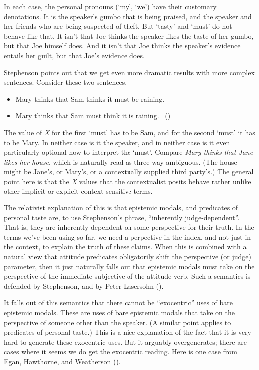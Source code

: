 \documentclass[
  10pt,
  letterpaper,
  DIV=11,
  numbers=noendperiod,
  twoside]{scrartcl}
\providecommand{\tightlist}{%
  \setlength{\itemsep}{0pt}\setlength{\parskip}{0pt}}\usepackage{longtable,booktabs,array}
\begin{document}
In each case, the personal pronouns (`my', `we') have their customary
denotations. It is the speaker's gumbo that is being praised, and the
speaker and her friends who are being suspected of theft. But `tasty'
and `must' do not behave like that. It isn't that Joe thinks the speaker
likes the taste of her gumbo, but that Joe himself does. And it isn't
that Joe thinks the speaker's evidence entails her guilt, but that Joe's
evidence does.

Stephenson points out that we get even more dramatic results with more
complex sentences. Consider these two sentences.

\begin{itemize}
\tightlist
\item
  Mary thinks that Sam thinks it must be raining.
\item
  Mary thinks that Sam must think it is raining.
  ~()
\end{itemize}

The value of \emph{X} for the first `must' has to be Sam, and for the
second `must' it has to be Mary. In neither case is it the speaker, and
in neither case is it even particularly optional how to interpret the
`must'. Compare \emph{Mary thinks that Jane likes her house}, which is
naturally read as three-way ambiguous. (The house might be Jane's, or
Mary's, or a contextually supplied third party's.) The general point
here is that the \emph{X} values that the contextualist posits behave
rather unlike other implicit or explicit context-sensitive terms.

The relativist explanation of this is that epistemic modals, and
predicates of personal taste are, to use Stephenson's phrase,
``inherently judge-dependent''. That is, they are inherently dependent
on some perspective for their truth. In the terms we've been using so
far, we need a perpective in the index, and not just in the context, to
explain the truth of these claims. When this is combined with a natural
view that attitude predicates obligatorily shift the perspective (or
judge) parameter, then it just naturally falls out that epistemic modals
must take on the perspective of the immediate subjective of the attitude
verb. Such a semantics is defended by Stephenson, and by Peter Lasersohn
().

It falls out of this semantics that there cannot be ``exocentric'' uses
of bare epistemic modals. These are uses of bare epistemic modals that
take on the perspective of someone other than the speaker. (A similar
point applies to predicates of personal taste.) This is a nice
explanation of the fact that it is very hard to generate these
exocentric uses. But it arguably overgenerates; there are cases where it
seems we do get the exocentric reading. Here is one case from Egan,
Hawthorne, and Weatherson ().
\end{document}
